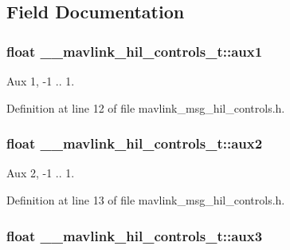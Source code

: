 \subsection{Field Documentation}
\hypertarget{struct____mavlink__hil__controls__t_ae8a7a69971e009abc390ed6f1950936a}{
\subsubsection[{aux1}]{\setlength{\rightskip}{0pt plus 5cm}float \-\_\-\-\_\-mavlink\-\_\-hil\-\_\-controls\-\_\-t\-::aux1}}\label{struct____mavlink__hil__controls__t_ae8a7a69971e009abc390ed6f1950936a}


Aux 1, -\/1 .. 1. 



Definition at line 12 of file mavlink\-\_\-msg\-\_\-hil\-\_\-controls.\-h.

\hypertarget{struct____mavlink__hil__controls__t_a34ee57a5807ad445506db9ba666e13d1}{
\subsubsection[{aux2}]{\setlength{\rightskip}{0pt plus 5cm}float \-\_\-\-\_\-mavlink\-\_\-hil\-\_\-controls\-\_\-t\-::aux2}}\label{struct____mavlink__hil__controls__t_a34ee57a5807ad445506db9ba666e13d1}


Aux 2, -\/1 .. 1. 



Definition at line 13 of file mavlink\-\_\-msg\-\_\-hil\-\_\-controls.\-h.

\hypertarget{struct____mavlink__hil__controls__t_ac90aa43f5be0ad189f9e42a4afec883f}{
\subsubsection[{aux3}]{\setlength{\rightskip}{0pt plus 5cm}float \-\_\-\-\_\-mavlink\-\_\-hil\-\_\-controls\-\_\-t\-::aux3}}\label{struct____mavlink__hil__controls__t_ac90aa43f5be0ad189f9e42a4afec883f}


